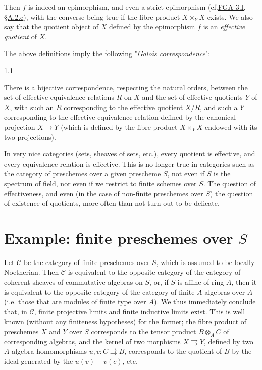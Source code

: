   Then \(f\) is indeed an epimorphism, and even a strict epimorphism (cf.\hyperref[fga3.i-a.2.c]{FGA 3.I, §A.2.c}), with the converse being true if the fibre product \(X\times _Y X\) exists.
  We also say that the quotient object of \(X\) defined by the epimorphism \(f\) is an \emph{effective quotient} of \(X\).\par{}The above definitions imply the following "\emph{Galois correspondence}":\begin{proposition}{1.1}\label{fga3.iii-1-proposition-1.1}\skipsinglepar\par{}There is a bijective correspondence, respecting the natural orders, between the set of effective equivalence relations \(R\) on \(X\) and the set of effective quotients \(Y\) of \(X\), with such an \(R\) corresponding to the effective quotient \(X/R\), and such a \(Y\) corresponding to the effective equivalence relation defined by the canonical projection \(X\to  Y\) (which is defined by the fibre product \(X\times _Y X\) endowed with its two projections).\end{proposition}\par{}In very nice categories (sets, sheaves of sets, etc.), every quotient is effective, and every equivalence relation is effective.
  This is no longer true in categories such as the category of preschemes over a given prescheme \(S\), not even if \(S\) is the spectrum of field, nor even if we restrict to finite schemes over \(S\).
  The question of effectiveness, and even (in the case of non-finite preschemes over \(S\)) the question of existence of quotients, more often than not turn out to be delicate.\chapter{Example: finite preschemes over \(S\)}\thispagestyle{fancy}\label{fga3.iii-2}\par{}Let \(\mathcal {C}\) be the category of finite preschemes over \(S\), which is assumed to be locally Noetherian.
  Then \(\mathcal {C}\) is equivalent to the opposite category of the category of coherent sheaves of commutative algebras on \(S\), or, if \(S\) is affine of ring \(A\), then it is equivalent to the opposite category of the category of finite \(A\)-algebras over \(A\) (i.e. those that are modules of finite type over \(A\)).
  We thus immediately conclude that, in \(\mathcal {C}\), finite projective limits and finite inductive limits exist.
  This is well known (without any finiteness hypotheses) for the former;
  the fibre product of preschemes \(X\) and \(Y\) over \(S\) corresponds to the tensor product \(B\otimes _A C\) of corresponding algebras, and the kernel of two morphisms \(X\rightrightarrows  Y\), defined by two \(A\)-algebra homomorphisms \(u,v\colon  C\rightrightarrows  B\), corresponds to the quotient of \(B\) by the ideal generated by the \(u(v)-v(c)\), etc.

